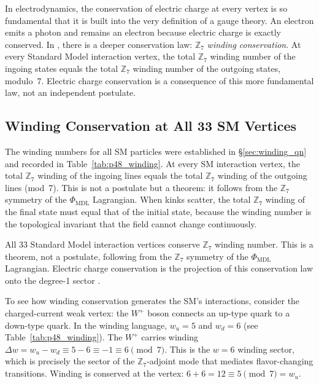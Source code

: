 \documentclass[11pt,openany]{book}
\theoremstyle{remark}
\newcommand{\GTE}{\text{GTE}}
\newcommand{\PHIMDL}{\Phi_{\mathrm{MDL}}}
\newcommand{\ZS}{\mathbb{Z}_7}
\newcommand{\CatAL}{\ensuremath{\textbf{A}_{\rm Lean}}}
\begin{document}
In electrodynamics, the conservation of electric charge at every vertex is so fundamental
that it is built into the very definition of a gauge theory.  An electron emits a photon
and remains an electron because electric charge is exactly conserved.  In \GTE{}, there is
a deeper conservation law: $\ZS$ \emph{winding conservation}.  At every Standard Model
interaction vertex, the total $\ZS$ winding number of the ingoing states equals the total
$\ZS$ winding number of the outgoing states, modulo~7.  Electric charge conservation is a
consequence of this more fundamental law, not an independent postulate.

\subsection*{Winding Conservation at All 33 SM Vertices}

The winding numbers for all SM particles were established in \S\ref{sec:winding_qn} and
recorded in Table~\ref{tab:p48_winding}.  At every SM interaction vertex, the total
$\ZS$ winding of the ingoing lines equals the total $\ZS$ winding of the outgoing lines
(mod~7).  This is not a postulate but a theorem: it follows from the $\ZS$ symmetry of
the $\PHIMDL$ Lagrangian.  When kinks scatter, the total $\ZS$ winding of the final state
must equal that of the initial state, because the winding number is the topological
invariant that the field cannot change continuously.

\begin{tcolorbox}[colback=orange!5,colframe=orange!60,title={Result: $\ZS$ Winding Conservation at SM Vertices (\CatAL)}]
All 33 Standard Model interaction vertices conserve $\ZS$ winding number.
This is a theorem, not a postulate, following from the $\ZS$ symmetry of the
$\PHIMDL$ Lagrangian.  Electric charge conservation
is the projection of this conservation law onto the degree-1 sector
\cite{SpivackGTEUnification,SpivackGTEPolynomialUFT}.
\end{tcolorbox}

To see how winding conservation generates the SM's interactions, consider the
charged-current weak vertex: the $W^+$ boson connects an up-type quark to a down-type
quark.  In the winding language, $w_u = 5$ and $w_d = 6$ (see Table~\ref{tab:p48_winding}).
The $W^+$ carries winding $\Delta w = w_u - w_d \equiv 5 - 6 \equiv -1 \equiv 6 \pmod 7$.
This is the $w = 6$ winding sector, which is precisely the sector of the
$\ZS$-adjoint mode that mediates flavor-changing transitions.  Winding is conserved at
the vertex: $6 + 6 = 12 \equiv 5 \pmod 7 = w_u$.
\end{document}
